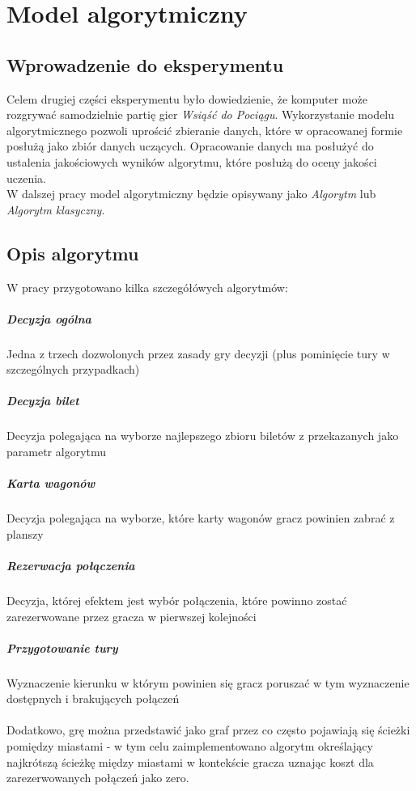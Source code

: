 \documentclass[12pt, oneside]{report}
\begin{document}
\chapter{Model algorytmiczny}
\label{model:algo}
\section{Wprowadzenie do eksperymentu}
Celem drugiej części eksperymentu było dowiedzienie, że komputer może rozgrywać samodzielnie partię gier \textit{Wsiąść do Pociągu}. Wykorzystanie modelu algorytmicznego pozwoli uprościć zbieranie danych, które w opracowanej formie posłużą jako zbiór danych uczących. Opracowanie danych ma posłużyć do ustalenia jakościowych wyników algorytmu, które posłużą do oceny jakości uczenia. \\
W dalszej pracy model algorytmiczny będzie opisywany jako \textit{Algorytm} lub \textit{Algorytm klasyczny}.
\section{Opis algorytmu}
W pracy przygotowano kilka szczegółówych algorytmów:
\paragraph{Decyzja ogólna} Jedna z trzech dozwolonych przez zasady gry decyzji (plus pominięcie tury w szczególnych przypadkach)
\paragraph{Decyzja bilet} Decyzja polegająca na wyborze najlepszego zbioru biletów z przekazanych jako parametr algorytmu
\paragraph{Karta wagonów} Decyzja polegająca na wyborze, które karty wagonów gracz powinien zabrać z planszy
\paragraph{Rezerwacja połączenia} Decyzja, której efektem jest wybór połączenia, które powinno zostać zarezerwowane przez gracza w pierwszej kolejności
\paragraph{Przygotowanie tury} Wyznaczenie kierunku w którym powinien się gracz poruszać w tym wyznaczenie dostępnych i brakujących połączeń
\\ \\
Dodatkowo, grę można przedstawić jako graf przez co często pojawiają się ścieżki pomiędzy miastami - w tym celu zaimplementowano algorytm określający najkrótszą ścieżkę między miastami w kontekście gracza uznając koszt dla zarezerwowanych połączeń jako zero.
\end{document}
